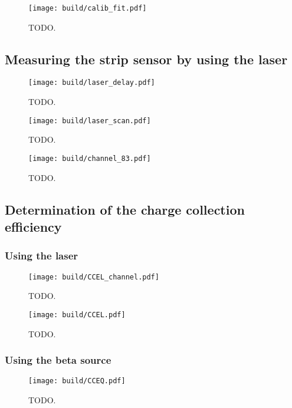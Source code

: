 \begin{figure}[H]
  \centering
  \texttt{[image: build/calib\_fit.pdf]}
  \caption{TODO.}
  \label{fig:calib_fit}
\end{figure}

\subsection{Measuring the strip sensor by using the laser}

\begin{figure}[H]
  \centering
  \texttt{[image: build/laser\_delay.pdf]}
  \caption{TODO.}
  \label{fig:laser_delay}
\end{figure}

\begin{figure}[H]
  \centering
  \texttt{[image: build/laser\_scan.pdf]}
  \caption{TODO.}
  \label{fig:laser_scan}
\end{figure}

\begin{figure}[H]
  \centering
  \texttt{[image: build/channel\_83.pdf]}
  \caption{TODO.}
  \label{fig:channel_83}
\end{figure}

\subsection{Determination of the charge collection efficiency}

\subsubsection{Using the laser}

\begin{figure}[H]
  \centering
  \texttt{[image: build/CCEL\_channel.pdf]}
  \caption{TODO.}
  \label{fig:CCEL_channel}
\end{figure}

\begin{figure}[H]
  \centering
  \texttt{[image: build/CCEL.pdf]}
  \caption{TODO.}
  \label{fig:CCEL}
\end{figure}

\subsubsection{Using the beta source}

\begin{figure}[H]
  \centering
  \texttt{[image: build/CCEQ.pdf]}
  \caption{TODO.}
  \label{fig:CCEQ}
\end{figure}


